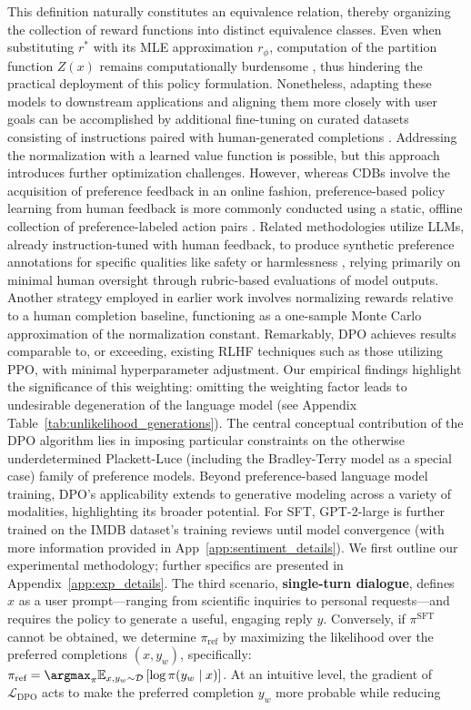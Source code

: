 \begin{lemma}
\begin{theorem}
This definition naturally constitutes an equivalence relation, thereby organizing the collection of reward functions into distinct equivalence classes. Even when substituting $r^*$ with its MLE approximation $r_\phi$, computation of the partition function $Z(x)$ remains computationally burdensome \citep{korbak2022reinforcement, go2023aligning}, thus hindering the practical deployment of this policy formulation. Nonetheless, adapting these models to downstream applications and aligning them more closely with user goals can be accomplished by additional fine-tuning on curated datasets consisting of instructions paired with human-generated completions \citep{mishra-etal-2022-cross,sanh2022multitask,chung2022scaling,thoppilan2022lamda}. Addressing the normalization with a learned value function is possible, but this approach introduces further optimization challenges. However, whereas CDBs involve the acquisition of preference feedback in an online fashion, preference-based policy learning from human feedback is more commonly conducted using a static, offline collection of preference-labeled action pairs \citep{yan2022human}. Related methodologies utilize LLMs, already instruction-tuned with human feedback, to produce synthetic preference annotations for specific qualities like safety or harmlessness \citep{bai2022constitutional}, relying primarily on minimal human oversight through rubric-based evaluations of model outputs. Another strategy employed in earlier work involves normalizing rewards relative to a human completion baseline, functioning as a one-sample Monte Carlo approximation of the normalization constant. Remarkably, DPO achieves results comparable to, or exceeding, existing RLHF techniques such as those utilizing PPO, with minimal hyperparameter adjustment. Our empirical findings highlight the significance of this weighting: omitting the weighting factor leads to undesirable degeneration of the language model (see Appendix Table~\ref{tab:unlikelihood_generations}). The central conceptual contribution of the DPO algorithm lies in imposing particular constraints on the otherwise underdetermined Plackett-Luce (including the Bradley-Terry model as a special case) family of preference models. Beyond preference-based language model training, DPO’s applicability extends to generative modeling across a variety of modalities, highlighting its broader potential. For SFT, GPT-2-large is further trained on the IMDB dataset's training reviews until model convergence (with more information provided in App~\ref{app:sentiment_details}). We first outline our experimental methodology; further specifics are presented in Appendix~\ref{app:exp_details}. The third scenario, \textbf{single-turn dialogue}, defines $x$ as a user prompt—ranging from scientific inquiries to personal requests—and requires the policy to generate a useful, engaging reply $y$. Conversely, if $\pi^\text{SFT}$ cannot be obtained, we determine $\pi_\text{ref}$ by maximizing the likelihood over the preferred completions ${(x, y_w)}$, specifically: ${\pi_\text{ref} = \argmax_{\pi}\mathbb{E}_{x, y_w \sim \mathcal{D}}\left[\log \pi(y_w \mid x)\right]}$. At an intuitive level, the gradient of $\mathcal{L}_\text{DPO}$ acts to make the preferred completion $y_w$ more probable while reducing 
\end{theorem}
\end{lemma}
